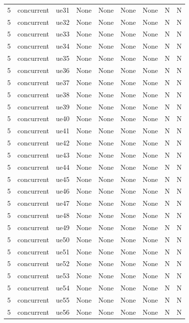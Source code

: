 \begin{table}[ht]
\begin{tabular}{|c|c|c|c|c|c|c|c|c|}
5 & concurrent & ue31 & None & None & None & None & N & N \\
5 & concurrent & ue32 & None & None & None & None & N & N \\
5 & concurrent & ue33 & None & None & None & None & N & N \\
5 & concurrent & ue34 & None & None & None & None & N & N \\
5 & concurrent & ue35 & None & None & None & None & N & N \\
5 & concurrent & ue36 & None & None & None & None & N & N \\
5 & concurrent & ue37 & None & None & None & None & N & N \\
5 & concurrent & ue38 & None & None & None & None & N & N \\
5 & concurrent & ue39 & None & None & None & None & N & N \\
5 & concurrent & ue40 & None & None & None & None & N & N \\
5 & concurrent & ue41 & None & None & None & None & N & N \\
5 & concurrent & ue42 & None & None & None & None & N & N \\
5 & concurrent & ue43 & None & None & None & None & N & N \\
5 & concurrent & ue44 & None & None & None & None & N & N \\
5 & concurrent & ue45 & None & None & None & None & N & N \\
5 & concurrent & ue46 & None & None & None & None & N & N \\
5 & concurrent & ue47 & None & None & None & None & N & N \\
5 & concurrent & ue48 & None & None & None & None & N & N \\
5 & concurrent & ue49 & None & None & None & None & N & N \\
5 & concurrent & ue50 & None & None & None & None & N & N \\
5 & concurrent & ue51 & None & None & None & None & N & N \\
5 & concurrent & ue52 & None & None & None & None & N & N \\
5 & concurrent & ue53 & None & None & None & None & N & N \\
5 & concurrent & ue54 & None & None & None & None & N & N \\
5 & concurrent & ue55 & None & None & None & None & N & N \\
5 & concurrent & ue56 & None & None & None & None & N & N \\

\end{tabular}
\end{table}
